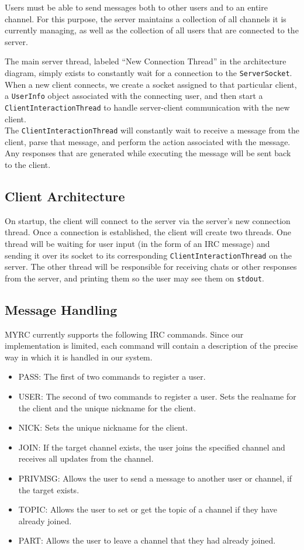 \documentclass{article}
\begin{document}
Users must be able to send messages both to other users and to an entire channel.
For this purpose, the server maintains a collection of all channels it is currently
managing, as well as the collection of all users that are connected to the server.

The main server thread, labeled ``New Connection Thread'' in the architecture diagram,
simply exists to constantly wait for a connection to the \texttt{ServerSocket}.  When
a new client connects, we create a socket assigned to that particular client, a \texttt{UserInfo}
object associated with the connecting user, and then start a \texttt{ClientInteractionThread}
to handle server-client communication with the new client.
\\

The \texttt{ClientInteractionThread} will constantly wait to receive a message from
the client, parse that message, and perform the action associated with the message.
Any responses that are generated while executing the message will be sent back to
the client.

\subsection{Client Architecture}

On startup, the client will connect to the server via the server's new connection thread.
Once a connection is established, the client will
create two threads.  One thread will be waiting for user input (in the form of an IRC message)
and sending it over its socket to its corresponding \texttt{ClientInteractionThread} on the server.
The other thread will be responsible for receiving chats or other responses from the server, and printing
them so the user may see them on \texttt{stdout}.

\subsection{Message Handling}

MYRC currently supports the following IRC commands. Since our implementation is
limited, each command will contain a description of the precise way in which it
is handled in our system.
\begin{itemize}
    \item PASS: The first of two commands to register a user.
    \item USER: The second of two commands to register a user. Sets the realname for
    the client and the unique nickname for the client.
    \item NICK: Sets the unique nickname for the client.
    \item JOIN: If the target channel exists, the user joins the specified channel
    and receives all updates from the channel.
    \item PRIVMSG: Allows the user to send a message to another user or channel,
    if the target exists.
    \item TOPIC: Allows the user to set or get the topic of a channel if they
    have already joined.
    \item PART: Allows the user to leave a channel that they had already joined.
\end{itemize}
\end{document}
